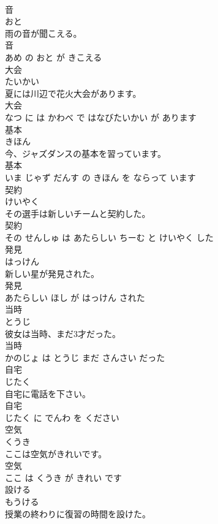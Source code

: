 \documentclass[8pt]{extreport}
\begin{document}
\begin{CJK}{UTF8}{min}
\\	音	
\\	おと			
\\	雨の音が聞こえる。	
\\	音 
\\	あめ の おと が きこえる			
\\	大会	
\\	たいかい			
\\	夏には川辺で花火大会があります。	
\\	大会 
\\	なつ に は かわべ で はなびたいかい が あります			
\\	基本	
\\	きほん			
\\	今、ジャズダンスの基本を習っています。	
\\	基本 
\\	いま じゃず だんす の きほん を ならって います			
\\	契約	
\\	けいやく			
\\	その選手は新しいチームと契約した。	
\\	契約 
\\	その せんしゅ は あたらしい ちーむ と けいやく した			
\\	発見	
\\	はっけん			
\\	新しい星が発見された。	
\\	発見 
\\	あたらしい ほし が はっけん された			
\\	当時	
\\	とうじ			
\\	彼女は当時、まだ3才だった。	
\\	当時 
\\	かのじょ は とうじ まだ さんさい だった			
\\	自宅	
\\	じたく			
\\	自宅に電話を下さい。	
\\	自宅 
\\	じたく に でんわ を ください			
\\	空気	
\\	くうき			
\\	ここは空気がきれいです。	
\\	空気 
\\	ここ は くうき が きれい です			
\\	設ける	
\\	もうける			
\\	授業の終わりに復習の時間を設けた。	

\end{CJK}
\end{document}
